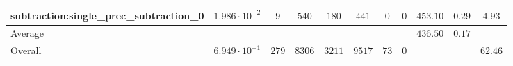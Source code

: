 \begin{tabular}{|l|c|c|c|c|c|c|c|c|c|c|}
subtraction:single\_prec\_subtraction\_0         & $ 1.986 \cdot 10^{-2} $ & $ 9      $ & $ 540  $ & $ 180  $ & $ 441   $ & $ 0  $ & $ 0 $ & $ 453.10      $ & $ 0.29    $ & $ 4.93    $ \\
\hline
Average                                          & $                     $ & $        $ & $      $ & $      $ & $       $ & $    $ & $   $ & $ 436.50      $ & $ 0.17    $ & $         $ \\
\hline
Overall                                          & $ 6.949 \cdot 10^{-1} $ & $ 279    $ & $ 8306 $ & $ 3211 $ & $ 9517  $ & $ 73 $ & $ 0 $ & $             $ & $         $ & $ 62.46   $ \\
\hline
\end{tabular}
